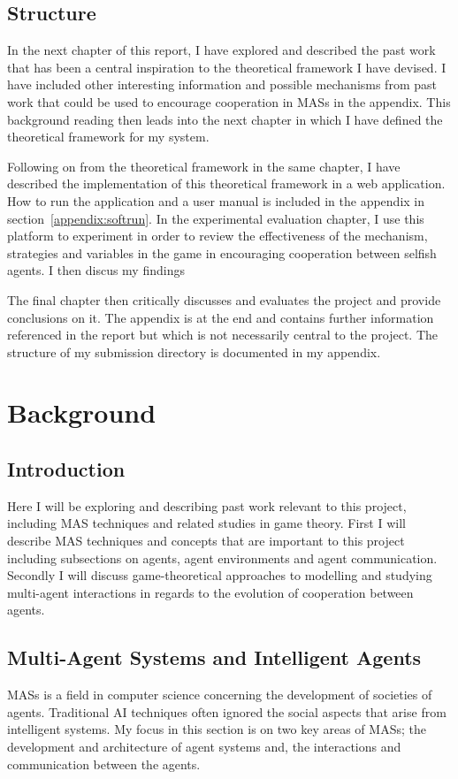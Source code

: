 \documentclass[]{final_report}
\begin{document}
\section{Structure}
In the next chapter of this report, I have explored and described the past work that has been a central inspiration to the theoretical framework I have devised. I have included other interesting information and possible mechanisms from past work that could be used to encourage cooperation in MASs in the appendix. This background reading then leads into the next chapter in which I have defined the theoretical framework for my system.\par
Following on from the theoretical framework in the same chapter, I have described the implementation of this theoretical framework in a web application. How to run the application and a user manual is included in the appendix in section~\ref{appendix:softrun}. In the experimental evaluation chapter, I use this platform to experiment in order to review the effectiveness of the mechanism, strategies and variables in the game in encouraging cooperation between selfish agents. I then discus my findings\par
The final chapter then critically discusses and evaluates the project and provide conclusions on it. The appendix is at the end and contains further information referenced in the report but which is not necessarily central to the project. The structure of my submission directory is documented in my appendix.

\chapter{Background}

\section{Introduction}
Here I will be exploring and describing past work relevant to this project, including MAS techniques and related studies in game theory. First I will describe MAS techniques and concepts that are important to this project including subsections on agents, agent environments and agent communication. Secondly I will discuss game-theoretical approaches to modelling and studying multi-agent interactions in regards to the evolution of cooperation between agents.

\section{Multi-Agent Systems and Intelligent Agents}
\label{sec:backgroundmas}
MASs is a field in computer science concerning the development of societies of agents. Traditional AI techniques often ignored the social aspects that arise from intelligent systems. My focus in this section is on two key areas of MASs; the development and architecture of agent systems and, the interactions and communication between the agents.
\end{document}
